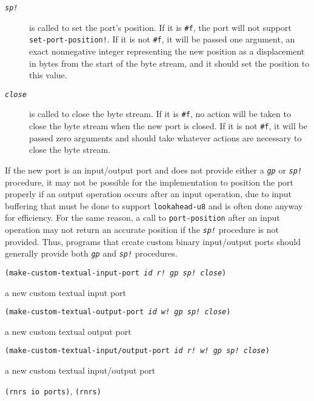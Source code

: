 \begin{description}
\item[\texttt{\textit{sp!}}]  is called to set the port's position.
If it is \texttt{\#{}f}, the port will not support \texttt{set-port-position!}.
If it is not \texttt{\#{}f}, it will be passed one argument, an exact
nonnegative integer representing the new position as a displacement in
bytes from the start of the byte stream, and it should set the position
to this value.

\item[\texttt{\textit{close}}]  is called to close the byte stream.
If it is \texttt{\#{}f}, no action will be taken to close the byte stream
when the new port is closed.
If it is not \texttt{\#{}f}, it will be passed zero arguments and should
take whatever actions are necessary to close the byte stream.

\end{description}


If the new port is an input/output port and does not provide either a
\texttt{\textit{gp}} or \texttt{\textit{sp!}} procedure, it may not be possible for the
implementation to position the port properly if an output operation occurs
after an input operation, due to input buffering that must be done to
support \texttt{lookahead-u8} and is often done anyway for efficiency.
For the same reason, a call to \texttt{port-position} after an input
operation may not return an accurate position if the \texttt{\textit{sp!}} procedure is
not provided.
Thus, programs that create custom binary input/output ports should generally
provide both \texttt{\textit{gp}} and \texttt{\textit{sp!}} procedures.


\begin{description}

\label{io_s42}\item[procedure] \texttt{(make-custom-textual-input-port \textit{id} \textit{r!} \textit{gp} \textit{sp!} \textit{close})}



\item[returns] a new custom textual input port


\item[procedure] \texttt{(make-custom-textual-output-port \textit{id} \textit{w!} \textit{gp} \textit{sp!} \textit{close})}



\item[returns] a new custom textual output port


\item[procedure] \texttt{(make-custom-textual-input/output-port \textit{id} \textit{r!} \textit{w!} \textit{gp} \textit{sp!} \textit{close})}



\item[returns] a new custom textual input/output port


\item[libraries] \texttt{(rnrs io ports)}, \texttt{(rnrs)}
\end{description}


